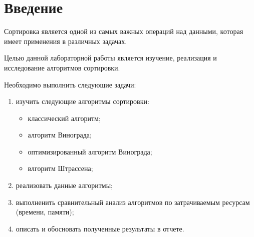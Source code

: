 \chapter*{Введение}

Сортировка является одной из самых важных операций над данными, которая имеет применения в различных задачах.

Целью данной лабораторной работы является изучение, реализация и исследование алгоритмов сортировки.

Необходимо выполнить следующие задачи:
\begin{enumerate}[]
    \item изучить следующие алгоритмы сортировки:
    \begin{itemize}
        \item классический алгоритм;
        \item алгоритм Винограда;
        \item оптимизированный алгоритм Винограда;
        \item влгоритм Штрассена;
    \end{itemize}
    \item реализовать данные алгоритмы;
    \item выполненить сравнительный анализ алгоритмов по затрачиваемым ресурсам (времени, памяти);
    \item описать и обосновать полученные результаты в отчете.
\end{enumerate}